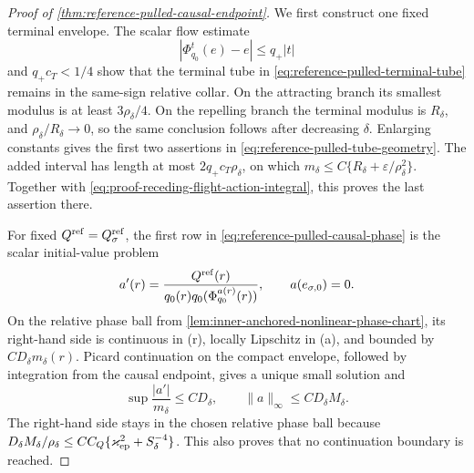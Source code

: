 \begin{proof}[Proof of
\cref{thm:reference-pulled-causal-endpoint}]
We first construct one fixed terminal envelope.  The scalar flow estimate
\[
 |\Phi_{q_0}^t(e)-e|\le q_+|t|
\]
and \(q_+c_T<1/4\) show that the terminal tube in
\cref{eq:reference-pulled-terminal-tube} remains in the same-sign relative
collar.  On the attracting branch its smallest modulus is at least
\(3\rho_\delta/4\).  On the repelling branch the terminal modulus is
\(R_\delta\), and
\(\rho_\delta/R_\delta\to0\), so the same conclusion follows after
decreasing \(\delta\).  Enlarging constants gives the first two assertions
in \cref{eq:reference-pulled-tube-geometry}.  The added interval has length
at most \(2q_+c_T\rho_\delta\), on which
\(m_\delta\le C\{R_\delta+\varepsilon/\rho_\delta^2\}\).
Together with \cref{eq:proof-receding-flight-action-integral}, this proves
the last assertion there.

For fixed \(Q^{\rm ref}=Q_\sigma^{\rm ref}\), the first row in
\cref{eq:reference-pulled-causal-phase} is the scalar initial-value problem
\begin{equation}
 a'(r)=\frac{Q^{\rm ref}(r)}
  {q_0(r)q_0(\Phi_{q_0}^{a(r)}(r))},
 \qquad a(e_{\sigma,0})=0.                       \label{eq:proof-reference-pulled-IVP}
\end{equation}
On the relative phase ball from
\cref{lem:inner-anchored-nonlinear-phase-chart}, its right-hand side is
continuous in (r), locally Lipschitz in (a), and bounded by
\(CD_\delta m_\delta(r)\).  Picard continuation on the compact envelope,
followed by integration from the causal endpoint, gives a unique small
solution and
\begin{equation}
 \sup\frac{|a'|}{m_\delta}\le CD_\delta,
 \qquad
 \|a\|_\infty\le CD_\delta M_\delta.             \label{eq:proof-reference-pulled-a-bound}
\end{equation}
The right-hand side stays in the chosen relative phase ball because
\(D_\delta M_\delta/\rho_\delta
 \le CC_Q\{\varkappa_{\rm ep}^2+S_\delta^{-4}\}\).
This also proves that no continuation boundary is reached.


\end{proof}
